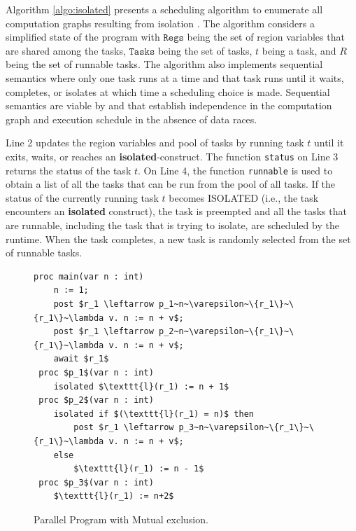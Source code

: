 Algorithm \ref{algo:isolated} presents a scheduling algorithm to enumerate all computation graphs resulting from isolation \cite{mercer2015model}. The algorithm considers a simplified state of the program with $\mathtt{Regs}$ being the set of region variables that are shared among the tasks, $\mathtt{Tasks}$ being the set of tasks, $t$ being a task, and $R$ being the set of runnable tasks. The algorithm also implements sequential semantics where only one task runs at a time and that task runs until it waits, completes, or isolates at which time a scheduling choice is made. Sequential semantics are viable  by  and  that establish independence in the computation graph and execution schedule in the absence of data races. 

Line 2 updates the region variables and pool of tasks by running task $t$ until it exits, waits, or reaches an \textbf{isolated}-construct. The function \texttt{status} on Line 3 returns the status of the task $t$. On Line 4, the function \texttt{runnable} is used to obtain a list of all the tasks that can be run from the pool of all tasks. If the status of the currently running task $t$ becomes ISOLATED (i.e., the task encounters an \textbf{isolated} construct), the task is preempted and all the tasks that are runnable, including the task that is trying to isolate, are scheduled by the runtime. When the task completes, a new task is randomly selected from the set of runnable tasks.

\begin{figure}
  \begin{center}
    \begin{lstlisting}[mathescape=true]
  proc main(var n : int)
  	n := 1;
  	post $r_1 \leftarrow p_1~n~\varepsilon~\{r_1\}~\{r_1\}~\lambda v. n := n + v$;
  	post $r_1 \leftarrow p_2~n~\varepsilon~\{r_1\}~\{r_1\}~\lambda v. n := n + v$;
  	await $r_1$
 proc $p_1$(var n : int)
 	isolated $\texttt{l}(r_1) := n + 1$
 proc $p_2$(var n : int)
	isolated if $(\texttt{l}(r_1) = n)$ then
	  	post $r_1 \leftarrow p_3~n~\varepsilon~\{r_1\}~\{r_1\}~\lambda v. n := n + v$;
	else
		$\texttt{l}(r_1) := n - 1$
 proc $p_3$(var n : int)
	$\texttt{l}(r_1) := n+2$
\end{lstlisting}
  \end{center}
  \vspace{-1em}
  \caption{Parallel Program with Mutual exclusion.}
  \vspace{-1em}
  \label{fig:hj-isolated}
\end{figure}

